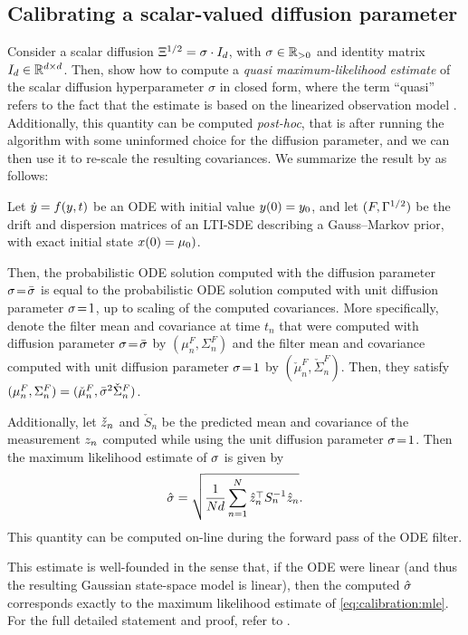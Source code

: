 \documentclass{mimosis}
\begin{document}
\subsection{Calibrating a scalar-valued diffusion parameter}
\label{sec:orge45a786}
\label{sec:calibration:global:scalar}
Consider a scalar diffusion \(\Xi^{1/2} = \sigma \cdot I_{d}\), with \(\sigma \in \mathbb{R}_{>0}\) and identity matrix \(I_{d} \in \mathbb{R}^{d \times d}\).
Then, \textcite[][Proposition 4]{tronarp18_probab_solut_to_ordin_differ}
show how to compute a \emph{quasi maximum-likelihood estimate} of the scalar diffusion hyperparameter \(\sigma\) in closed form,
where the term ``quasi'' refers to the fact that the estimate is based on the linearized observation model \parencite{lindstrom2018statistics}.
Additionally, this quantity can be computed \emph{post-hoc}, that is after running the algorithm with some uninformed choice for the diffusion parameter, and we can then use it to re-scale the resulting covariances.
We summarize the result by \textcite[][Proposition 4]{tronarp18_probab_solut_to_ordin_differ} as follows:
\begin{proposition}
Let
\(\dot{\val} = \vf(\val, t)\)
be an ODE with initial value
\(y(0) = y_0\),
and let \((F, \Gamma^{1/2})\) be the drift and dispersion matrices of an LTI-SDE describing a Gauss--Markov prior,
with exact initial state \(x(0) = \mu_{0} )\).

Then, the probabilistic ODE solution computed with the diffusion parameter
\(\sigma\!=\!\bar{\sigma}\)
is equal to the probabilistic ODE solution computed with unit diffusion parameter
\(\sigma\!=\!1\),
up to scaling of the computed covariances.
More specifically, denote the filter mean and covariance at time \(t_n\) that were computed with diffusion parameter
\(\sigma\!=\!\bar{\sigma}\)
by \((\mu_n^F, \Sigma_n^F)\)
and the filter mean and covariance computed with unit diffusion parameter
\(\sigma\!=\!1\)
by \((\check{\mu}_n^F, \check{\Sigma}_n^F)\).
Then, they satisfy \((\mu_n^F, \Sigma_n^F) = (\check{\mu}_n^F, \bar{\sigma}^2 \check{\Sigma}_n^F)\).

Additionally, let
\(\check{z}_n\) and \(\check{S}_n\)
be the predicted mean and covariance of the measurement \(z_n\)
computed while using the unit diffusion parameter
\(\sigma\!=\!1\).
Then the maximum likelihood estimate of \(\sigma\) is given by
\begin{equation}
  \hat{\sigma} = \sqrt{ \frac{1}{Nd} \sum_{n=1}^N \hat{z}_n^\top S_n^{-1} \hat{z}_n }.
\end{equation}
This quantity can be computed on-line during the forward pass of the ODE filter.
\label{prop:global-scalar-calibration}
\end{proposition}
This estimate is well-founded in the sense that, if the ODE were linear (and thus the resulting Gaussian state-space model is linear), then the computed \(\hat{\sigma}\) corresponds exactly to the maximum likelihood estimate of \cref{eq:calibration:mle}.
For the full detailed statement and proof,
refer to
\textcite[][Proposition 4]{tronarp18_probab_solut_to_ordin_differ}.
\end{document}
